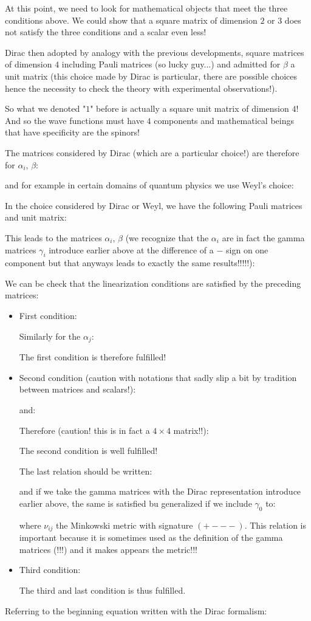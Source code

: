 	At this point, we need to look for mathematical objects that meet the three conditions above. We could show that a square matrix of dimension $2$ or $3$ does not satisfy the three conditions and a scalar even less!

	Dirac then adopted by analogy with the previous developments, square matrices of dimension $4$ including Pauli matrices (so lucky guy...) and admitted for $\beta$ a unit matrix (this choice made by Dirac is particular, there are possible choices hence the necessity to check the theory with experimental observations!).

	So what we denoted "$1$" before is actually a square unit matrix of dimension $4$! And so the wave functions must have $4$ components and mathematical beings that have specificity are the spinors!

	The matrices considered by Dirac (which are a particular choice!) are therefore for $\alpha_i$, $\beta$:
	
	and for example in certain domains of quantum physics we use Weyl's choice:
	
	In the choice considered by Dirac or Weyl, we have the following Pauli matrices and unit matrix:
	
	This leads to the matrices $\alpha_i$, $\beta$ (we recognize that the $\alpha_i$ are in fact the gamma matrices $\gamma_i$ introduce earlier above at the difference of a $-$ sign on one component but that anyways leads to exactly the same results!!!!!):
	
	We can be check that the linearization conditions are satisfied by the preceding matrices:
	\begin{itemize}
		\item First condition:
		
		Similarly for the $\alpha_j$:
		
		The first condition is therefore fulfilled!
	
		\item Second condition (caution with notations that sadly slip a bit by tradition between matrices and scalars!):
		
		and:
		
		Therefore (caution! this is in fact a $4\times 4$ matrix!!):
		
		The second condition is well fulfilled!
		\begin{tcolorbox}[title=Remark,colframe=black,arc=10pt]
		The last relation should be written:
		
		and if we take the gamma matrices with the Dirac representation introduce earlier above, the same is satisfied bu generalized if we include $\gamma_0$ to:
		
		where $\nu_{ij}$ the Minkowski metric with signature $(+ - - -)$. This relation is important because it is sometimes used as the definition of the gamma matrices (!!!) and it makes appears the metric!!!
		\end{tcolorbox}
		
		\item Third condition:
		
		The third and last condition is thus fulfilled.
	\end{itemize}
	Referring to the beginning equation written with the Dirac formalism:
	
